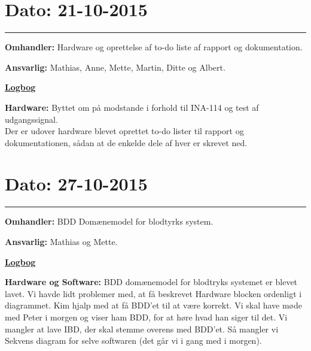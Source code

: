 \section{Dato: 21-10-2015}
\hrule
\textbf{Omhandler:} Hardware og oprettelse af to-do liste af rapport og dokumentation.

\textbf{Ansvarlig:} Mathias, Anne, Mette, Martin, Ditte og Albert.

\underline{\textbf{Logbog}}

\textbf{Hardware: }Byttet om på modstande i forhold til INA-114 og test af udgangssignal. 
\\
Der er udover hardware blevet oprettet to-do lister til rapport og dokumentationen, sådan at de enkelde dele af hver er skrevet ned.

\section{Dato: 27-10-2015}
\hrule
\textbf{Omhandler:} BDD Domænemodel for blodtyrks system. 

\textbf{Ansvarlig:} Mathias og Mette.

\underline{\textbf{Logbog}}

\textbf{Hardware og Software: } BDD domænemodel for blodtryks systemet er blevet lavet. Vi havde lidt problemer med, at få beskrevet Hardware blocken ordenligt i diagrammet. Kim hjalp med at få BDD'et til at være korrekt. Vi skal have møde med Peter i morgen og viser ham BDD, for at høre hvad han siger til det. 
Vi mangler at lave IBD, der skal stemme overens med BDD'et. Så mangler vi Sekvens diagram for selve softwaren (det går vi i gang med i morgen).
\\
